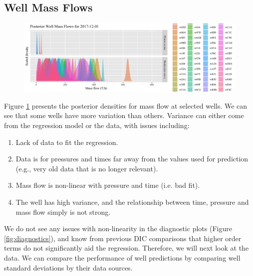 \documentclass[a4paper, 12pt]{article}
\begin{document}
\subsection{Well Mass Flows}
\begin{figure}
\centering
  \includegraphics[width=\linewidth]{media/mf_wells}
  \label{fig:mf_wells}
\end{figure}

Figure \ref{fig:mf_wells} presents the posterior densities for mass flow at selected wells. We can see that some wells have more variation than others. Variance can either come from the regression model or the data, with issues including:

\begin{enumerate}
\item Lack of data to fit the regression.
\item Data is for pressures and times far away from the values used for prediction (e.g., very old data that is no longer relevant).
\item Mass flow is non-linear with pressure and time (i.e. bad fit).
\item The well has high variance, and the relationship between time, pressure and mass flow simply is not strong.
\end{enumerate}

We do not see any issues with non-linearity in the diagnostic plots (Figure \ref{fig:diagnostics}), and know from previous DIC comparisons that higher order terms do not significantly aid the regression. Therefore, we will next look at the data. We can compare the performance of well predictions by comparing well standard deviations by their data sources.
\end{document}
